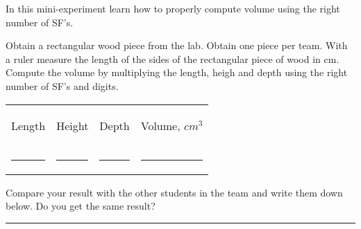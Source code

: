 \documentclass[main.tex]{subfiles}
\begin{document}
 
\vspace{0.2cm}{\large \bfseries 3. Measuring volume}
In this mini-experiment learn how to properly compute volume using the right number of SF's. 
\begin{steps}
    \newstep[] Obtain a rectangular wood piece from the lab. Obtain one piece per team.
        \newstep[]  With a ruler measure the length of the sides of the rectangular piece of wood in cm.
        \newstep[]  Compute the volume by multiplying the length, heigh and depth using the right number of SF's and digits.

\begin{center} \begin{tabular}{ p{3cm} p{3cm} p{3cm}p{3cm}   }
   \begin{bf}Length\end{bf} & \begin{bf}Height\end{bf} &\begin{bf}Depth\end{bf} &\begin{bf}Volume, $cm^3$\end{bf} \\[0.1cm]     
  \rule{3cm}{0.4pt} 				&\rule{3cm}{0.4pt}&\rule{3cm}{0.4pt}&\rule{3cm}{0.4pt}  \\[0.3cm]           
 \end{tabular}\end{center}
         \newstep[] Compare your result with the other students in the team and write them down below. Do you get the same result?    
         
     \begin{center}    \rule{8cm}{0.4pt}\end{center}
\end{steps}
\end{document}
